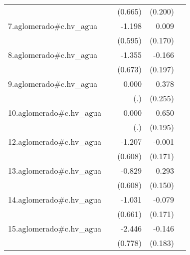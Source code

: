 {\begin{longtable}{l*{4}{D{.}{.}{-1}}}
            &                     &     (0.665)         &     (0.200)         &                     \\
\addlinespace
7.aglomerado#c.hv\_agua&                     &      -1.198\sym{*}  &       0.009         &                     \\
            &                     &     (0.595)         &     (0.170)         &                     \\
\addlinespace
8.aglomerado#c.hv\_agua&                     &      -1.355\sym{*}  &      -0.166         &                     \\
            &                     &     (0.673)         &     (0.197)         &                     \\
\addlinespace
9.aglomerado#c.hv\_agua&                     &       0.000         &       0.378         &                     \\
            &                     &         (.)         &     (0.255)         &                     \\
\addlinespace
10.aglomerado#c.hv\_agua&                     &       0.000         &       0.650\sym{***}&                     \\
            &                     &         (.)         &     (0.195)         &                     \\
\addlinespace
12.aglomerado#c.hv\_agua&                     &      -1.207\sym{*}  &      -0.001         &                     \\
            &                     &     (0.608)         &     (0.171)         &                     \\
\addlinespace
13.aglomerado#c.hv\_agua&                     &      -0.829         &       0.293         &                     \\
            &                     &     (0.608)         &     (0.150)         &                     \\
\addlinespace
14.aglomerado#c.hv\_agua&                     &      -1.031         &      -0.079         &                     \\
            &                     &     (0.661)         &     (0.171)         &                     \\
\addlinespace
15.aglomerado#c.hv\_agua&                     &      -2.446\sym{**} &      -0.146         &                     \\
            &                     &     (0.778)         &     (0.183)         &                     \\

\end{longtable}}

